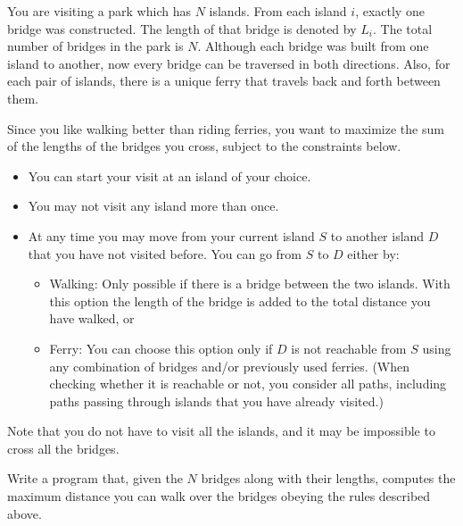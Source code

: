 You are visiting a park which has $N$ islands. From each island $i$, exactly one bridge was constructed. The length of that bridge is denoted by $L_i$. The total number of bridges in the park is $N$. Although each bridge was built from one island to another, now every bridge can be traversed in both directions. Also, for each pair of islands, there is a unique ferry that travels back and forth between them. 

Since you like walking better than riding ferries, you want to maximize the sum of the lengths of the bridges you cross, subject to the constraints below.
\begin{itemize}
\item You can start your visit at an island of your choice.
\item You may not visit any island more than once.
\item At any time you may move from your current island $S$ to another island $D$ that you have not visited before. You can go from $S$ to $D$ either by:
\begin{itemize}
\item Walking: Only possible if there is a bridge between the two islands. With this option the length of the bridge is added to the total distance you have walked, or
\item Ferry: You can choose this option only if $D$ is not reachable from $S$ using any combination of bridges and/or previously used ferries. (When checking whether it is reachable or not, you consider all paths, including paths passing through islands that you have already visited.)
\end{itemize}
\end{itemize}

Note that you do not have to visit all the islands, and it may be impossible to cross all the bridges.

Write a program that, given the $N$ bridges along with their lengths, computes the maximum distance you can walk over the bridges obeying the rules described above.